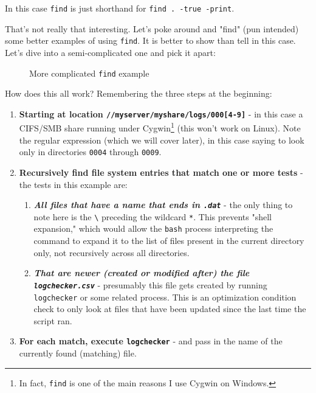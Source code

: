 \documentclass[10pt,american,]{book}
\newenvironment{Shaded}{\begin{snugshade}}{\end{snugshade}}
\newcommand{\KeywordTok}[1]{\textcolor[rgb]{0.13,0.29,0.53}{\textbf{{#1}}}}
\newcommand{\DataTypeTok}[1]{\textcolor[rgb]{0.13,0.29,0.53}{{#1}}}
\newcommand{\NormalTok}[1]{{#1}}
\numberwithin{figure}{chapter}
\DeclareRobustCommand{\drcap}[1]{\begin{figure}[H]\caption{#1}\end{figure}}
\renewcommand{\KeywordTok}[1]{{#1}}
\renewcommand{\DataTypeTok}[1]{{#1}}
\renewcommand{\NormalTok}[1]{{#1}}
\begin{document}
In this case \texttt{find} is just shorthand for
\texttt{find\ .\ -true\ -print}.

That's not really that interesting. Let's poke around and "find" (pun
intended) some better examples of using \texttt{find}. It is better to
show than tell in this case. Let's dive into a semi-complicated one and
pick it apart:

\drcap{More complicated \texttt{find} example}

\begin{Shaded}
\end{Shaded}

How does this all work? Remembering the three steps at the beginning:

\begin{enumerate}
\def\labelenumi{\arabic{enumi}.}
\item
  \textbf{Starting at location
  \texttt{//myserver/myshare/logs/000{[}4-9{]}}} - in this case a
  CIFS/SMB share running under Cygwin\footnote{In fact, \texttt{find} is
    one of the main reasons I use Cygwin on Windows.} (this won't work
  on Linux). Note the regular expression (which we will cover later), in
  this case saying to look only in directories \texttt{0004} through
  \texttt{0009}.
\item
  \textbf{Recursively find file system entries that match one or more
  tests} - the tests in this example are:

  \begin{enumerate}
  \def\labelenumii{\alph{enumii}.}
  \item
    \textbf{\emph{All files that have a name that ends in
    \texttt{.dat}}} - the only thing to note here is the
    \texttt{\textbackslash{}} preceding the wildcard \texttt{*}. This
    prevents "shell expansion," which would allow the \texttt{bash}
    process interpreting the command to expand it to the list of files
    present in the current directory only, not recursively across all
    directories.
  \item
    \textbf{\emph{That are newer (created or modified after) the file
    \texttt{logchecker.csv}}} - presumably this file gets created by
    running \texttt{logchecker} or some related process. This is an
    optimization condition check to only look at files that have been
    updated since the last time the script ran.
  \end{enumerate}
\item
  \textbf{For each match, execute \texttt{logchecker}} - and pass in the
  name of the currently found (matching) file.
\end{enumerate}
\end{document}
